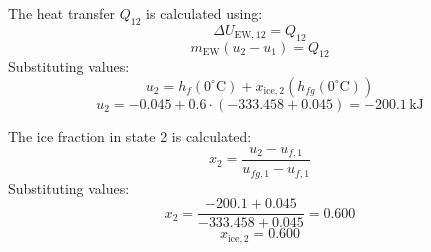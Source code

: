 The heat transfer \( Q_{12} \) is calculated using:  
\[
\Delta U_{\text{EW},12} = Q_{12}
\]  
\[
m_{\text{EW}} (u_2 - u_1) = Q_{12}
\]  
Substituting values:  
\[
u_2 = h_f(0^\circ \text{C}) + x_{\text{ice},2} (h_{fg}(0^\circ \text{C}))
\]  
\[
u_2 = -0.045 + 0.6 \cdot (-333.458 + 0.045) = -200.1 \, \text{kJ}
\]  

The ice fraction in state 2 is calculated:  
\[
x_2 = \frac{u_2 - u_{f,1}}{u_{fg,1} - u_{f,1}}
\]  
Substituting values:  
\[
x_2 = \frac{-200.1 + 0.045}{-333.458 + 0.045} = 0.600
\]  
\[
x_{\text{ice},2} = 0.600
\]